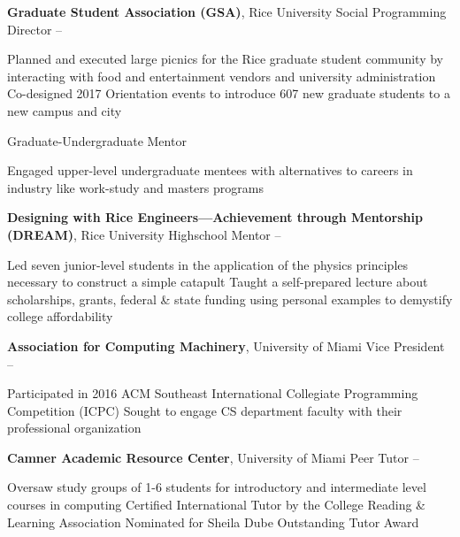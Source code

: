 \documentclass[letterpaper,MMMyyyy,nonstopmode]{simpleresumecv}
\begin{document}
\begin{Body}
\Entry
\textbf{Graduate Student Association (GSA)}, Rice University
\Gap
\BulletItem Social Programming Director
\hfill {} -- 
\begin{Detail}
\SubBulletItem Planned and executed large picnics for the Rice graduate student community by interacting with food and entertainment vendors and university administration
\SubBulletItem Co-designed 2017 Orientation events to introduce 607 new graduate students to a new campus and city
\end{Detail}
\BulletItem Graduate-Undergraduate Mentor
\begin{Detail}
\SubBulletItem Engaged upper-level undergraduate mentees with alternatives to careers in industry like work-study and masters programs
\end{Detail}

\Entry
\textbf{Designing with Rice Engineers---Achievement through Mentorship (DREAM)}, Rice University
\Gap
\BulletItem Highschool Mentor
\hfill {} -- 
\begin{Detail}
\SubBulletItem Led seven junior-level students in the application of the physics principles necessary to construct a simple catapult
\SubBulletItem Taught a self-prepared lecture about scholarships, grants, federal \& state funding using personal examples to demystify college affordability
\end{Detail}

\Entry
\textbf{Association for Computing Machinery}, University of Miami
\Gap
\BulletItem Vice President
\hfill {} -- 
\begin{Detail}
\SubBulletItem Participated in 2016 ACM Southeast International Collegiate Programming Competition (ICPC)
\SubBulletItem Sought to engage CS department faculty with their professional organization
\end{Detail}

\Entry
\textbf{Camner Academic Resource Center}, University of Miami
\Gap
\BulletItem Peer Tutor
\hfill {} -- 
\begin{Detail}
\SubBulletItem Oversaw study groups of 1-6 students for introductory and intermediate level courses in computing
\SubBulletItem Certified International Tutor by the College Reading \& Learning Association
\SubBulletItem Nominated for Sheila Dube Outstanding Tutor Award
\end{Detail}

\end{Body}
\end{document}
